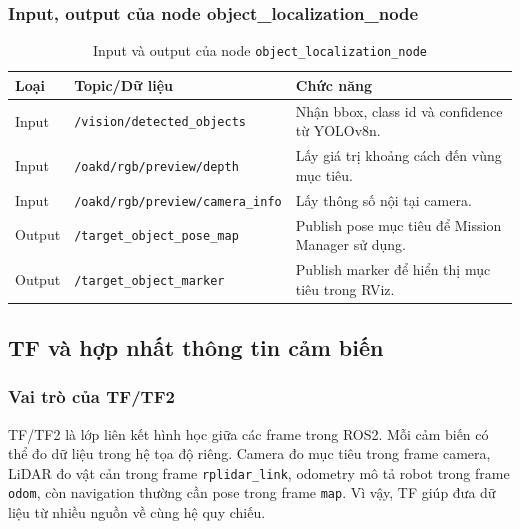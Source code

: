 \subsubsection{Input, output của node object\_localization\_node}
\label{subsubsec:object-localization-io}

\begin{table}[H]
    \centering
    \caption{Input và output của node \texttt{object\_localization\_node}}
    \label{tab:object-localization-node-io}
    \renewcommand{\arraystretch}{1.25}
    \small
    \begin{tabularx}{\textwidth}{|>{\raggedright\arraybackslash}p{}|>{\raggedright\arraybackslash}p{}|>{\raggedright\arraybackslash}X|}
        \hline
        \textbf{Loại} & \textbf{Topic/Dữ liệu} & \textbf{Chức năng} \\
        \hline
        Input & \texttt{/vision/detected\_objects} & Nhận bbox, class id và confidence từ YOLOv8n. \\
        \hline
        Input & \texttt{/oakd/rgb/preview/depth} & Lấy giá trị khoảng cách đến vùng mục tiêu. \\
        \hline
        Input & \texttt{/oakd/rgb/preview/}\newline\texttt{camera\_info} & Lấy thông số nội tại camera. \\
        \hline
        Output & \texttt{/target\_object\_pose\_map} & Publish pose mục tiêu để Mission Manager sử dụng. \\
        \hline
        Output & \texttt{/target\_object\_marker} & Publish marker để hiển thị mục tiêu trong RViz. \\
        \hline
    \end{tabularx}
\end{table}

\subsection{TF và hợp nhất thông tin cảm biến}
\label{subsec:tf-fusion}

\subsubsection{Vai trò của TF/TF2}
\label{subsubsec:tf-role}

TF/TF2 là lớp liên kết hình học giữa các frame trong ROS2. Mỗi cảm biến có thể đo dữ liệu trong hệ tọa độ riêng. Camera đo mục tiêu trong frame camera, LiDAR đo vật cản trong frame \texttt{rplidar\_link}, odometry mô tả robot trong frame \texttt{odom}, còn navigation thường cần pose trong frame \texttt{map}. Vì vậy, TF giúp đưa dữ liệu từ nhiều nguồn về cùng hệ quy chiếu.

